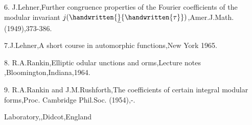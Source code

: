 6. J.Lehner,Further congruence properties of the Fourier coefficients of the modular invariant $j(\handwritten{\underline}{\handwritten{\tau}})$,Amer.J.Math.(1949),373-386.

7.J.Lehner,A short course in automorphic functions,New York 1965.

8. R.A.Rankin,Elliptic odular unctions and orms,Lecture notes ,Bloomington,Indiana,1964.

9. R.A.Rankin and J.M.Rushforth,The coefficients of certain integral modular forms,Proc. Cambridge Phil.Soc. (1954),-.\margin{\handwritten{\#}}

   Laboratory,,Didcot,England

